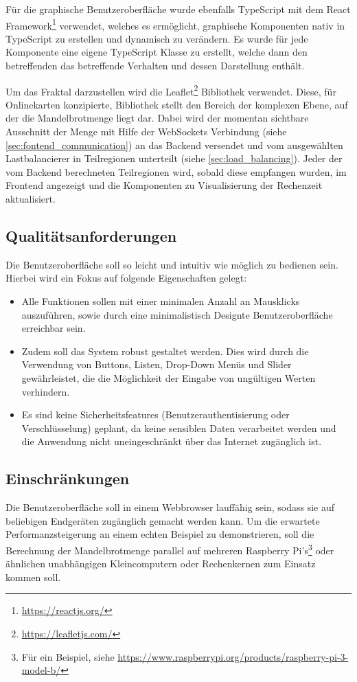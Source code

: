 Für die graphische Benutzeroberfläche wurde ebenfalls TypeScript mit dem React Framework\footnote{\url{https://reactjs.org/}} verwendet, welches es ermöglicht,
graphische Komponenten nativ in TypeScript zu erstellen und dynamisch zu verändern.
Es wurde für jede Komponente eine eigene TypeScript Klasse zu erstellt, welche dann den betreffenden
das betreffende Verhalten und dessen Darstellung enthält.


Um das Fraktal darzustellen wird die Leaflet\footnote{\url{https://leafletjs.com/}} Bibliothek verwendet.
Diese, für Onlinekarten konzipierte, Bibliothek stellt den Bereich der komplexen Ebene, auf der die Mandelbrotmenge liegt dar.
Dabei wird der momentan sichtbare Ausschnitt der Menge mit Hilfe der WebSockets Verbindung (siehe \autoref{sec:fontend_communication}) an das Backend versendet und vom ausgewählten Lastbalancierer in Teilregionen unterteilt (siehe \autoref{sec:load_balancing}).
Jeder der vom Backend berechneten Teilregionen wird, sobald diese empfangen wurden, im Frontend angezeigt und die Komponenten
zu Visualisierung der Rechenzeit aktualisiert.

\subsection{Qualitätsanforderungen}

Die Benutzeroberfläche soll so leicht und intuitiv wie möglich zu bedienen sein.
Hierbei wird ein Fokus auf folgende Eigenschaften gelegt:
\begin{itemize}
	\item Alle Funktionen sollen mit einer minimalen
	      Anzahl an Mausklicks auszuführen, sowie durch eine
	      minimalistisch Designte Benutzeroberfläche erreichbar sein.
	\item Zudem soll das System robust gestaltet werden.
	      Dies wird durch die Verwendung von Buttons, Listen, Drop-Down Menüs und Slider gewährleistet,
	      die die Möglichkeit der Eingabe von ungültigen Werten verhindern.
	\item Es sind keine Sicherheitsfeatures (Benutzerauthentisierung oder Verschlüsselung) geplant,
	      da keine sensiblen Daten verarbeitet werden und die Anwendung nicht uneingeschränkt über das Internet zugänglich ist.
\end{itemize}



\subsection{Einschränkungen}

Die Benutzeroberfläche soll in einem Webbrowser lauffähig sein, sodass sie auf beliebigen Endgeräten
zugänglich gemacht werden kann.
Um die erwartete Performanzsteigerung an einem echten Beispiel zu demonstrieren,
soll die Berechnung der Mandelbrotmenge parallel auf mehreren Raspberry Pi’s\footnote{Für ein Beispiel, siehe \url{https://www.raspberrypi.org/products/raspberry-pi-3-model-b/}} oder ähnlichen unabhängigen Kleincomputern oder Rechenkernen zum Einsatz kommen soll.
